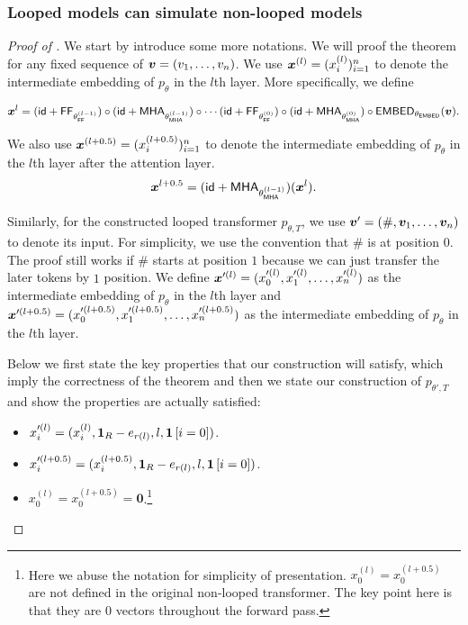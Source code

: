 \subsubsection{Looped models can simulate non-looped models}
\label{sec:apx_simulate_nonlooped}


\begin{proof}[Proof of ]

We start by introduce some more notations. We will proof the theorem for any fixed sequence of ${\bm{v}} = (v_1,\ldots, v_n)$. We use ${\bm{x}}^{(l)}=(x_{i}^{(l)})_{i=1}^n$ to denote the intermediate embedding of $p_{\theta}$ in the $l$th layer. More specifically, we define 

\begin{align}
    {\bm{x}}^{l} = (\mathsf{id}+ \mathsf{FF}_{\theta^{(l-1)}_{\mathsf{FF}}})\circ (\mathsf{id}+ \mathsf{MHA}_{\theta^{(l-1)}_{\mathsf{MHA}}})\circ \cdots (\mathsf{id}+ \mathsf{FF}_{\theta^{(0)}_{\mathsf{FF}}})\circ (\mathsf{id}+ \mathsf{MHA}_{\theta^{(0)}_{\mathsf{MHA}}})\circ \mathsf{EMBED}_{\theta_{\mathsf{EMBED}}}({\bm{v}}).
\end{align}

We also use ${\bm{x}}^{(l+0.5)}=(x_{i}^{(l+0.5)})_{i=1}^n$ to denote the intermediate embedding of $p_{\theta}$ in the $l$th layer after the attention layer.
\begin{align}
    {\bm{x}}^{l+0.5} =  (\mathsf{id}+ \mathsf{MHA}_{\theta^{(l-1)}_{\mathsf{MHA}}})({\bm{x}}^{l}).
\end{align}

Similarly, for the constructed looped transformer $p_{\theta,T}$, we use ${\bm{v}}'=(\#,{\bm{v}}_1,\ldots,{\bm{v}}_n)$ to denote its input. For simplicity, we use the convention that $\#$ is at position $0$. The proof still works if $\#$ starts at position $1$ because we can just transfer the later tokens by $1$ position. We define ${\bm{x}}'^{(l)}=(x'^{(l)}_0,x'^{(l)}_1,\ldots,x'^{(l)}_n)$ as the intermediate embedding of $p_{\theta}$ in the $l$th layer and ${\bm{x}}'^{(l+0.5)}=(x'^{(l+0.5)}_0,x'^{(l+0.5)}_1,\ldots,x'^{(l+0.5)}_n)$ as the intermediate embedding of $p_{\theta}$ in the $l$th layer.

Below we first state the key properties that our construction will satisfy, which imply the correctness of the theorem and then we state our construction of $p_{\theta',T}$ and show the properties are actually satisfied:
\begin{itemize}
    \item $x'^{(l)}_{i} = (x^{(l)}_i, \bm{1}_{R} - e_{r(l)},l, \bm{1}\left[i=0\right])$.
    \item $x'^{(l+0.5)}_{i} = (x^{(l+0.5)}_i, \bm{1}_{R} - e_{r(l)},l, \bm{1}\left[i=0\right])$.
    \item $x^{(l)}_0 = x^{(l+0.5)}_0 = \bm{0}$.\footnote{Here we abuse the notation for simplicity of presentation. $x^{(l)}_0 = x^{(l+0.5)}_0$ are not defined in the original non-looped transformer. The key point here is that they are 0 vectors throughout the forward pass.}
\end{itemize}


\end{proof}
